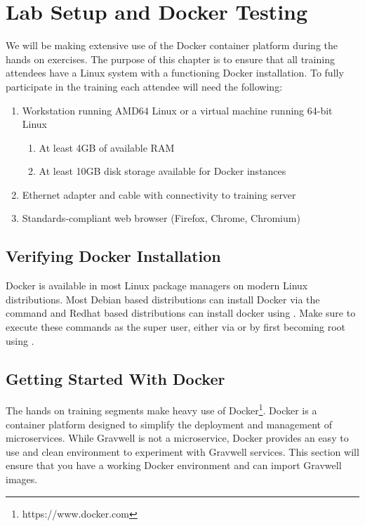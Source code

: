 \chapter{Lab Setup and Docker Testing}

We will be making extensive use of the Docker container platform during
the hands on exercises. The purpose of this chapter is to ensure that
all training attendees have a Linux system with a functioning Docker
installation. To fully participate in the training each attendee will
need the following:

\begin{enumerate}
	\item Workstation running AMD64 Linux or a virtual machine running 64-bit Linux
	\begin{enumerate}
		\item At least 4GB of available RAM
		\item At least 10GB disk storage available for Docker instances
	\end{enumerate}
	\item Ethernet adapter and cable with connectivity to training server
	\item Standards-compliant web browser (Firefox, Chrome, Chromium)
\end{enumerate}

\section{Verifying Docker Installation}

Docker is available in most Linux package managers on modern Linux
distributions. Most Debian based distributions can install Docker via
the command  and Redhat based distributions can
install docker using . Make sure to execute these
commands as the super user, either via  or by first becoming
root using .

\section{Getting Started With Docker}

The hands on training segments make heavy use of
Docker\footnote{https://www.docker.com}. Docker is
a container platform designed to simplify the deployment and management
of microservices. While Gravwell is not a microservice, Docker provides
an easy to use and clean environment to experiment with Gravwell
services. This section will ensure that you have a working Docker
environment and can import Gravwell images.

